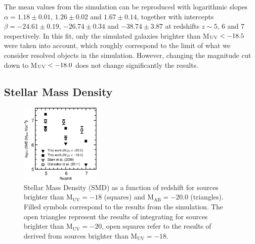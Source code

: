 \documentclass{emulateapj}
\begin{document}
The mean values from the simulation can be reproduced with logarithmic slopes
$\alpha=1.18\pm0.01$, $1.26\pm0.02$ and $1.67\pm0.14$, together with intercepts $\beta=-24.61\pm 0.19$, $-26.74\pm 0.34$ and $-38.74\pm 3.87$ at redshifts $z\sim 5$, $6$ and $7$ respectively. In this fit, only the simulated galaxies brighter than
M$_{\rm UV}<-18.5$ were taken into account, which roughly correspond to
the limit of what we consider resolved objects in the
simulation. However, changing the magnitude cut down to M$_{\rm
  UV}<-18.0$ does not change significantly the results. 



\subsection{Stellar Mass Density} 

\begin{figure}
\begin{center}
\includegraphics[width=0.35\textwidth]{./mstar_dens_z.ps}
\end{center}
\caption{Stellar Mass Density (SMD) as a function of redshift for sources
  brighter than $\mathrm{M_{UV}}=-18$ (squares) and $\mathrm{M_{AB}}=-20.0$
  (triangles).  Filled symbols correspond to the results from the
  simulation. The open triangles represent the results of
  \citet{2009ApJ...697.1493S} integrating for sources brighter than
  $\mathrm{M_{UV}}=-20$, open squares refer   to the results of
  \citet{2011ApJ...735L..34G} derived from sources brighter   than
  $\mathrm{M_{UV}}=-18$. \label{fig:SMD}
}
\end{figure}
\end{document}
